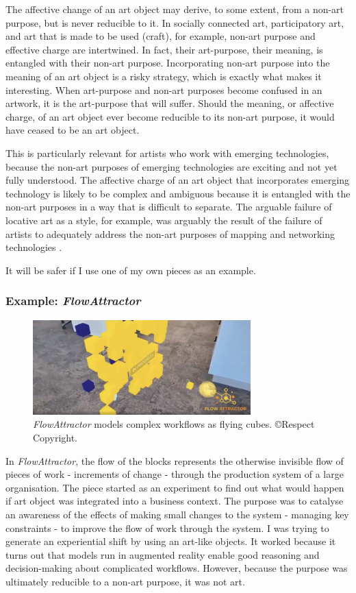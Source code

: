 \documentclass[letterpaper]{article}
\begin{document}
    The affective change of an art object may derive, to some extent, from a non-art purpose, but is never reducible to it. In socially connected art, participatory art, and art that is made to be used (craft), for example, non-art purpose and effective charge are intertwined. In fact, their art-purpose, their meaning, is entangled with their non-art purpose. Incorporating non-art purpose into the meaning of an art object is a risky strategy, which is exactly what makes it interesting. When art-purpose and non-art purposes become confused in an artwork, it is the art-purpose that will suffer. Should the meaning, or affective charge, of an art object ever become reducible to its non-art purpose, it would have ceased to be an art object.
    
    This is particularly relevant for artists who work with emerging technologies, because the non-art purposes of emerging technologies are exciting and not yet fully understood. The affective charge of an art object that incorporates emerging technology is likely to be complex and ambiguous because it is entangled with the non-art purposes in a way that is difficult to separate. The arguable failure of locative art as a style, for example, was arguably the result of the failure of artists to adequately address the non-art purposes of mapping and networking technologies \citep{questioningTheFrame2004}.

    It will be safer if I use one of my own pieces as an example.

    \subsubsection{Example: \emph{FlowAttractor}}

    \begin{figure}[h]
    \includegraphics[width=3.31in]{flow-attractor.png}
    \caption{\emph{FlowAttractor} models complex workflows as flying cubes. \copyright Respect Copyright.}
    \end{figure}

    In \emph{FlowAttractor}, the flow of the blocks represents the otherwise invisible flow of pieces of work - increments of change - through the production system of a large organisation. The piece started as an experiment to find out what would happen if art object was integrated into a business context. The purpose was to catalyse an awareness of the effects of making small changes to the system - managing key constraints - to improve the flow of work through the system. I was trying to generate an experiential shift by using an art-like objects. It worked because it turns out that models run in augmented reality enable good reasoning and decision-making about complicated workflows. However, because the purpose was ultimately reducible to a non-art purpose, it was not art.
\end{document}
